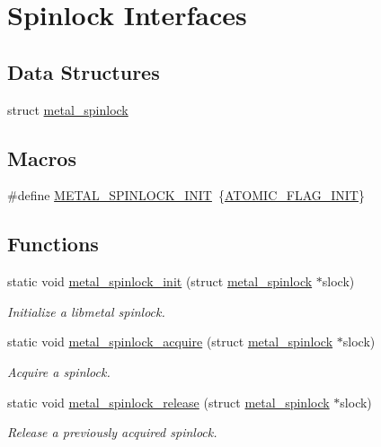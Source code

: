 \hypertarget{group__spinlock}{}\section{Spinlock Interfaces}
\label{group__spinlock}
\subsection*{Data Structures}
\begin{DoxyCompactItemize}
\item 
struct \hyperlink{structmetal__spinlock}{metal\+\_\+spinlock}
\end{DoxyCompactItemize}
\subsection*{Macros}
\begin{DoxyCompactItemize}
\item 
\#define \hyperlink{group__spinlock_gaf288da07864ad9a8c622641e8022f560}{M\+E\+T\+A\+L\+\_\+\+S\+P\+I\+N\+L\+O\+C\+K\+\_\+\+I\+N\+IT}~\{\hyperlink{compiler_2gcc_2atomic_8h_a3cf6ded3b463faf0cedce1718caaa695}{A\+T\+O\+M\+I\+C\+\_\+\+F\+L\+A\+G\+\_\+\+I\+N\+IT}\}
\end{DoxyCompactItemize}
\subsection*{Functions}
\begin{DoxyCompactItemize}
\item 
static void \hyperlink{group__spinlock_ga4b326a00b704a510310776ee55ccb35e}{metal\+\_\+spinlock\+\_\+init} (struct \hyperlink{structmetal__spinlock}{metal\+\_\+spinlock} $\ast$slock)
\begin{DoxyCompactList}\small\item\em Initialize a libmetal spinlock. \end{DoxyCompactList}\item 
static void \hyperlink{group__spinlock_gab95ccf0f56b35afe3be1406ffa7b4943}{metal\+\_\+spinlock\+\_\+acquire} (struct \hyperlink{structmetal__spinlock}{metal\+\_\+spinlock} $\ast$slock)
\begin{DoxyCompactList}\small\item\em Acquire a spinlock. \end{DoxyCompactList}\item 
static void \hyperlink{group__spinlock_ga510a38b5255ebf26d279e8b5b7aaa976}{metal\+\_\+spinlock\+\_\+release} (struct \hyperlink{structmetal__spinlock}{metal\+\_\+spinlock} $\ast$slock)
\begin{DoxyCompactList}\small\item\em Release a previously acquired spinlock. \end{DoxyCompactList}\end{DoxyCompactItemize}


